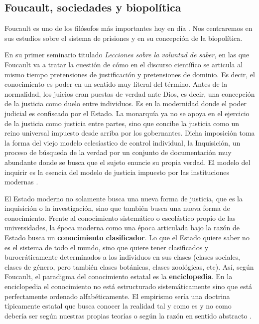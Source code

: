 \documentclass[11pt]{article}
\begin{document}
\subsection{Foucault, sociedades y biopolítica}
Foucault es uno de los filósofos más importantes hoy en día \cite{ernesto-foucault}. Nos centraremos en sus estudios sobre el sistema de prisiones y en su concepción de la biopolítica.

En su primer seminario titulado \textit{Lecciones sobre la voluntad de saber}, en las que Foucault va a tratar la cuestión de cómo en el discurso científico se articula al mismo tiempo pretensiones de justificación y pretensiones de dominio. Es decir, el conocimiento es poder en un sentido muy literal del término. Antes de la normalidad, los juicios eran puestas de verdad ante Dios, es decir, una concepción de la justicia como duelo entre individuos. Es en la modernidad donde el poder judicial es confiscado por el Estado. La monarquía ya no se apoya en el ejercicio de la justicia como justicia entre partes, sino que concibe la justicia como un reino universal impuesto desde arriba por los gobernantes. Dicha imposición toma la forma del viejo modelo eclesíastico de control individual, la Inquisición, un proceso de búsqueda de la verdad por un conjunto de documentación muy abundante donde se busca que el sujeto enuncie su propia verdad. El modelo del inquirir es la esencia del modelo de justicia impuesto por las instituciones modernas \cite{ernesto-foucault}. 

El Estado moderno no solamente busca una nueva forma de justicia, que es la inquisición o la investigación, sino que también busca una nueva forma de conocimiento. Frente al conocimiento sistemático o escolástico propio de las universidades, la época moderna como una época articulada bajo la razón de Estado busca un \textbf{conocimiento clasificador}. Lo que el Estado quiere saber no es el sistema de todo el mundo, sino que quiere tener clasificados y burocráticamente determinados a los individuos en sus clases (clases sociales, clases de género, pero también clases botánicas, clases zoológicas, etc). Así, según Foucault, el paradigma del conocimiento estatal es la \textbf{enciclopedia}. En la enciclopedia el conocimiento no está estructurado sistemáticamente sino que está perfectamente ordenado alfabéticamente. El empirismo sería una doctrina típicamente estatal que busca conocer la realidad tal y como es y no como debería ser según nuestras propias teorías o según la razón en sentido abstracto \cite{ernesto-foucault}.
\end{document}
